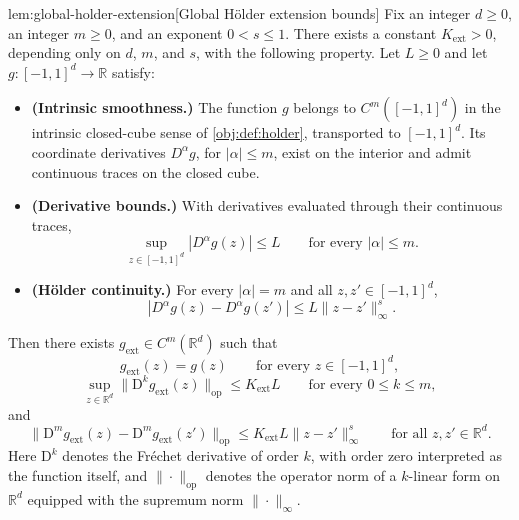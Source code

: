 \documentclass[11pt]{article}
\begin{document}
\begin{lemmav}{lem:global-holder-extension}[Global Hölder extension bounds]
Fix an integer \(d\ge0\), an integer \(m\ge0\), and an exponent \(0<s\le1\). There exists a constant \(K_{\mathrm{ext}}>0\), depending only on \(d\), \(m\), and \(s\), with the following property. Let \(L\ge0\) and let \(g:[-1,1]^d\to\mathbb R\) satisfy:
\begin{itemize}
\item \textbf{(Intrinsic smoothness.)} The function \(g\) belongs to \(C^m([-1,1]^d)\) in the intrinsic closed-cube sense of \cref{obj:def:holder}, transported to \([-1,1]^d\). Its coordinate derivatives \(D^\alpha g\), for \(|\alpha|\le m\), exist on the interior and admit continuous traces on the closed cube.
\item \textbf{(Derivative bounds.)} With derivatives evaluated through their continuous traces,
\[
\sup_{z\in[-1,1]^d}|D^\alpha g(z)|\le L
\qquad\text{for every }|\alpha|\le m.
\]
\item \textbf{(Hölder continuity.)} For every \(|\alpha|=m\) and all \(z,z'\in[-1,1]^d\),
\[
|D^\alpha g(z)-D^\alpha g(z')|
\le L\|z-z'\|_\infty^{s}.
\]
\end{itemize}
Then there exists \(g_{\mathrm{ext}}\in C^m(\mathbb R^d)\) such that
\[
g_{\mathrm{ext}}(z)=g(z)
\qquad\text{for every }z\in[-1,1]^d,
\]
\[
\sup_{z\in\mathbb R^d}
\|\mathrm D^{k}g_{\mathrm{ext}}(z)\|_{\mathrm{op}}
\le K_{\mathrm{ext}}L
\qquad\text{for every }0\le k\le m,
\]
and
\[
\|\mathrm D^{m}g_{\mathrm{ext}}(z)
-\mathrm D^{m}g_{\mathrm{ext}}(z')\|_{\mathrm{op}}
\le K_{\mathrm{ext}}L\|z-z'\|_\infty^{s}
\qquad\text{for all }z,z'\in\mathbb R^d.
\]
Here \(\mathrm D^{k}\) denotes the Fréchet derivative of order \(k\), with order zero interpreted as the function itself, and \(\|\cdot\|_{\mathrm{op}}\) denotes the operator norm of a \(k\)-linear form on \(\mathbb R^d\) equipped with the supremum norm \(\|\cdot\|_\infty\).
\end{lemmav}
\end{document}
